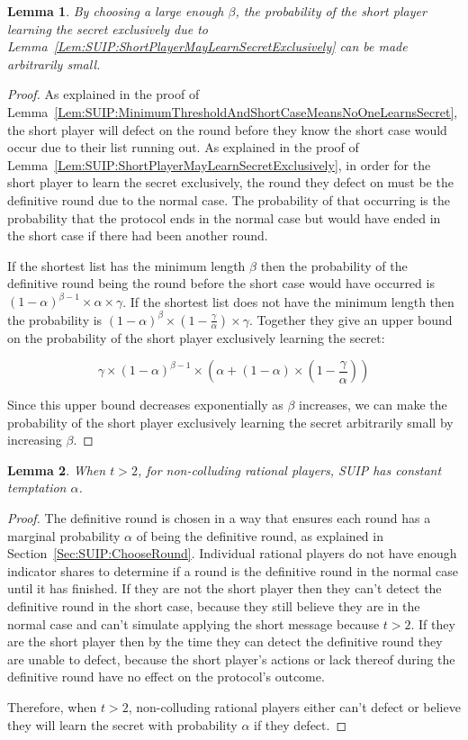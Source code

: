 \documentclass{dalcsthesis}
\newtheorem{lemma}{Lemma}
\begin{document}
\begin{lemma}\label{Lem:SUIP:ShortPlayerLearningSecretExclusivelyIsReducible}By choosing a large enough $\beta$, the probability of the short player learning the secret exclusively due to Lemma~\ref{Lem:SUIP:ShortPlayerMayLearnSecretExclusively} can be made arbitrarily small.\end{lemma} 
\begin{proof}
As explained in the proof of Lemma~\ref{Lem:SUIP:MinimumThresholdAndShortCaseMeansNoOneLearnsSecret}, the short player will defect on the round before they know the short case would occur due to their list running out. As explained in the proof of Lemma~\ref{Lem:SUIP:ShortPlayerMayLearnSecretExclusively}, in order for the short player to learn the secret exclusively, the round they defect on must be the definitive round due to the normal case. The probability of that occurring is the probability that the protocol ends in the normal case but would have ended in the short case if there had been another round.

If the shortest list has the minimum length $\beta$ then the probability of the definitive round being the round before the short case would have occurred is $(1-\alpha)^{\beta-1} \times \alpha \times \gamma$. If the shortest list does not have the minimum length then the probability is $(1-\alpha)^\beta \times (1 - \frac{\gamma}{\alpha}) \times \gamma$. Together they give an upper bound on the probability of the short player exclusively learning the secret:

$$\gamma \times (1-\alpha)^{\beta-1} \times (\alpha + (1-\alpha) \times (1 - \frac{\gamma}{\alpha}))$$

Since this upper bound decreases exponentially as $\beta$ increases, we can make the probability of the short player exclusively learning the secret arbitrarily small by increasing $\beta$.
\end{proof}

\begin{lemma}\label{Lem:SUIP:NonColludersNotTemptedExceptT2}When $t > 2$, for non-colluding rational players, SUIP has constant temptation $\alpha$.\end{lemma}
\begin{proof}
The definitive round is chosen in a way that ensures each round has a marginal probability $\alpha$ of being the definitive round, as explained in Section~\ref{Sec:SUIP:ChooseRound}. Individual rational players do not have enough indicator shares to determine if a round is the definitive round in the normal case until it has finished. If they are not the short player then they can't detect the definitive round in the short case, because they still believe they are in the normal case and can't simulate applying the short message because $t > 2$. If they are the short player then by the time they can detect the definitive round they are unable to defect, because the short player's actions or lack thereof during the definitive round have no effect on the protocol's outcome.

Therefore, when $t > 2$, non-colluding rational players either can't defect or believe they will learn the secret with probability $\alpha$ if they defect.
\end{proof}
\end{document}
